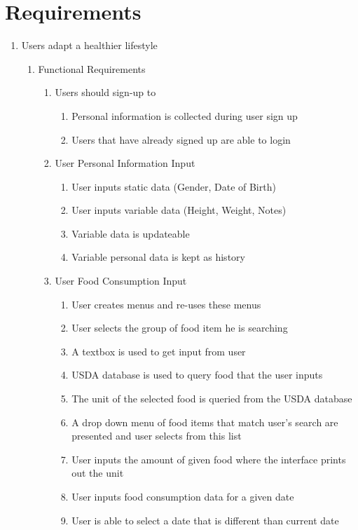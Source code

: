 \section{Requirements}
\begin{enumerate}
\item Users adapt a healthier lifestyle 
	\begin{enumerate}
	\item Functional Requirements
		\begin{enumerate}
		\item Users should sign-up to 
			\begin{enumerate}
			\item Personal information is collected during user sign up
			\item Users that have already signed up are able to login
			\end{enumerate}
		\item User Personal Information Input
			\begin{enumerate}
			\item User inputs static data (Gender, Date of Birth)
			\item User inputs variable data (Height, Weight, Notes)
			\item Variable data is updateable
			\item Variable personal data is kept as history
			\end{enumerate}
		\item User Food Consumption Input
			\begin{enumerate}
			\item User creates menus and re-uses these menus
			\item User selects the group of food item he is searching
			\item A textbox is used to get input from user
			\item USDA database is used to query food that the user inputs
			\item The unit of the selected food is queried from the USDA database
			\item A drop down menu of food items that match user’s search are  presented and user selects from this list
			\item User inputs the amount of given food where the interface prints out the unit
			\item User inputs food consumption data for a given date
			\item User is able to select a date that is different than current date

\end{enumerate}
\end{enumerate}
\end{enumerate}
\end{enumerate}
